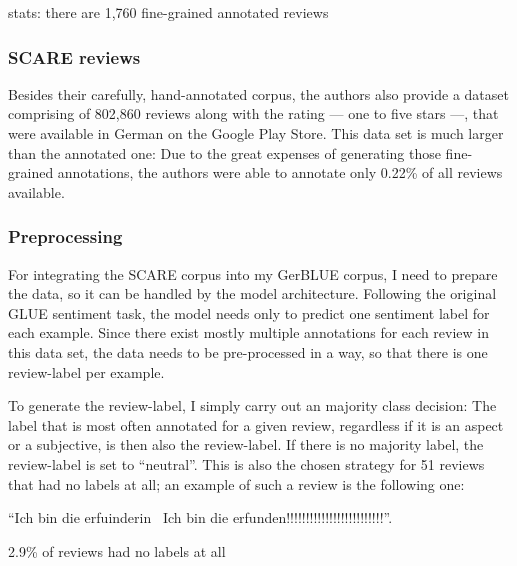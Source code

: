 stats: there are 1,760 fine-grained annotated reviews

\subsubsection{SCARE reviews}

Besides their carefully, hand-annotated corpus, the authors also provide a dataset comprising of
802,860 reviews along with the rating --- one to five stars ---, that were available in German on
the Google Play Store.
This data set is much larger than the annotated one: Due to the great expenses of generating those
fine-grained annotations, the authors were able to annotate only 0.22\% of all reviews available.


\subsubsection{Preprocessing}

For integrating the SCARE corpus into my GerBLUE corpus, I need to prepare the data, so it can be
handled by the model architecture.
Following the original GLUE sentiment task, the model needs only to predict one sentiment label
for each example.
Since there exist mostly multiple annotations for each review in this data set, the data needs to
be pre-processed in a way, so that there is one review-label per example.

To generate the review-label, I simply carry out an majority class decision:
The label that is most often annotated for a given review, regardless if it is an aspect or a
subjective, is then also the review-label.
If there is no majority label, the review-label is set to ``neutral''.
This is also the chosen strategy for 51 reviews that had no labels at all; an example of such a
review is the following one:

\begin{examples}
  \item ``Ich bin die erfuinderin \textbar \textbar\ Ich bin die erfunden!!!!!!!!!!!!!!!!!!!!!!!!!''.
\end{examples}

2.9\% of reviews had no labels at all

